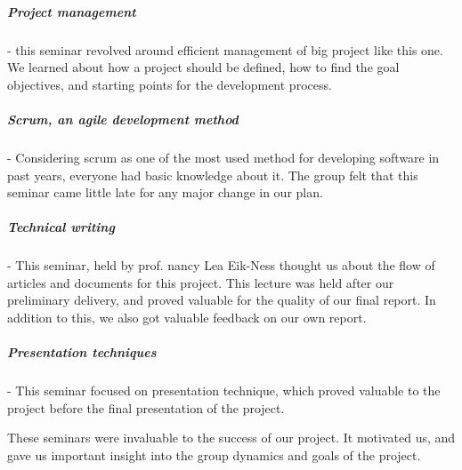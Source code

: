   \subparagraph{Project management} - this seminar revolved around efficient
  management of big project like this one. We learned about how a project should
  be defined, how to find the goal objectives, and starting points for the
  development process. 
  
   \subparagraph{Scrum, an agile development method} - Considering scrum as one
   of the most used method for developing software in past years, everyone had
   basic knowledge about it.  The group felt that this seminar came little late
   for any major change in our plan.  

  \subparagraph{Technical writing} - This seminar, held by prof. nancy Lea
  Eik-Ness thought us about the flow of articles and documents for this project.
  This lecture was held after our preliminary delivery, and proved valuable for
  the quality of our final report. In addition to this, we also got valuable
  feedback on our own report.

  \subparagraph{Presentation techniques} - This seminar focused on presentation
  technique, which proved valuable to the project before the final presentation
  of the project.

  These seminars were invaluable to the success of our project. It motivated us,
  and gave us important insight into the group dynamics and goals of the
  project.

